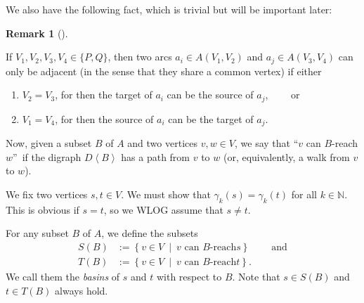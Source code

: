 \documentclass[numbers=enddot,12pt,final,onecolumn,notitlepage]{scrartcl}%
\theoremstyle{definition}
\newtheorem{remk}[theo]{Remark}
\newenvironment{remark}[1][]
{\begin{remk}[#1]\begin{leftbar}}
{\end{leftbar}\end{remk}}
\theoremstyle{plainsl}
\begin{document}
We also have the following fact, which is trivial but will be important later:

\begin{remark}
\label{adjarcs}
    If $V_{1},V_{2},V_{3},V_{4} \in \{P,Q\}$, then two arcs $a_{i} \in A(V_{1},V_{2})$ and $a_{j} \in A(V_{3},V_{4})$ can only be adjacent (in the sense that they share a common vertex) if either \begin{enumerate}
        \item $V_{2} = V_{3}$, for then the target of $a_{i}$ can be the source of $a_{j}$, \ \ \ \ or
        \item $V_{1} = V_{4}$, for then the source of $a_{i}$ can be the target of $a_{j}$.
    \end{enumerate}
\end{remark}

Now, given a subset $B$ of $A$ and two vertices $v,w\in V$, we say that
\textquotedblleft$v$ can $B$-reach $w$\textquotedblright\ if the digraph
$D\left\langle B\right\rangle $ has a path from $v$ to $w$ (or, equivalently,
a walk from $v$ to $w$).

We fix two vertices $s,t\in V$. We must show that $\gamma_{k}\left(  s\right)
=\gamma_{k}\left(  t\right)  $ for all $k\in\mathbb{N}$. This is obvious if
$s=t$, so we WLOG assume that $s\neq t$.

For any subset $B$ of $A$, we define the subsets%
\begin{align*}
S\left(  B\right)   &  :=\left\{  v\in V\ \mid\ v\text{ can }B\text{-reach
}s\right\}  \ \ \ \ \ \ \ \ \ \ \text{and}\\
T\left(  B\right)   &  :=\left\{  v\in V\ \mid\ v\text{ can }B\text{-reach
}t\right\}  .
\end{align*}
We call them the \emph{basins} of $s$ and $t$ with respect to $B$. Note that
$s\in S\left(  B\right)  $ and $t\in T\left(  B\right)  $ always hold.
\end{document}
